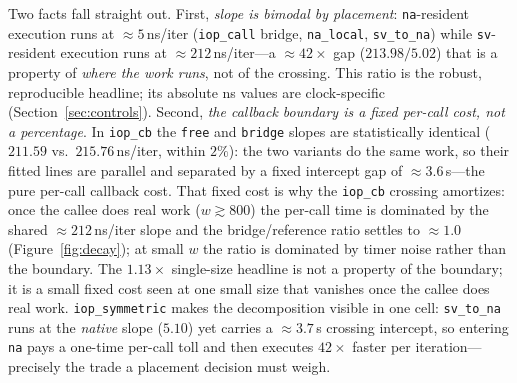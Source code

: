 \documentclass[conference]{IEEEtran}
\newcommand{\code}[1]{\texttt{#1}}
\begin{document}
Two facts fall straight out. First, \emph{slope is bimodal by placement}:
\code{na}-resident execution runs at $\approx$$5$\,ns/iter
(\code{iop\_call} bridge, \code{na\_local}, \code{sv\_to\_na}) while
\code{sv}-resident execution runs at $\approx$$212$\,ns/iter---a
$\approx$$42\times$ gap ($213.98/5.02$) that is a property of \emph{where the
work runs}, not of the crossing. This ratio is the robust, reproducible headline;
its absolute ns values are clock-specific (Section~\ref{sec:controls}). Second,
\emph{the callback boundary is a fixed per-call cost, not a percentage}. In
\code{iop\_cb} the \code{free} and \code{bridge} slopes are statistically
identical ($211.59$ vs.\ $215.76$\,ns/iter, within $2\%$): the two variants do
the same work, so their fitted lines are parallel and separated by a fixed
intercept gap of $\approx$$3.6$\,\textmu s---the pure per-call callback cost.
That fixed cost is why the \code{iop\_cb} crossing
amortizes: once the callee does real work ($w\gtrsim800$) the per-call time is
dominated by the shared $\approx$$212$\,ns/iter slope and the bridge/reference
ratio settles to $\approx$$1.0$ (Figure~\ref{fig:decay}); at small $w$ the ratio
is dominated by timer noise rather than the boundary. The
$1.13\times$ single-size headline is not a property of the boundary; it is a
small fixed cost seen at one small size that vanishes once the callee does real
work. \code{iop\_symmetric}
makes the decomposition visible in one cell: \code{sv\_to\_na} runs at the
\emph{native} slope ($5.10$) yet carries a $\approx$$3.7$\,\textmu s crossing
intercept, so entering \code{na} pays a one-time per-call toll and then executes
$42\times$ faster per iteration---precisely the trade a placement decision must
weigh.
\end{document}
